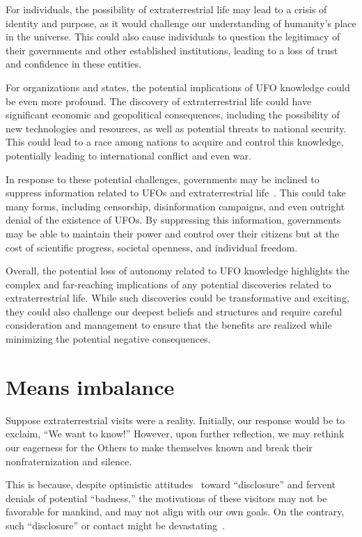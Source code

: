 For individuals, the possibility of extraterrestrial life may lead to a crisis of identity and purpose, as it would challenge our understanding of humanity's place in the universe. This could also cause individuals to question the legitimacy of their governments and other established institutions, leading to a loss of trust and confidence in these entities.

For organizations and states, the potential implications of UFO knowledge could be even more profound. The discovery of extraterrestrial life could have significant economic and geopolitical consequences, including the possibility of new technologies and resources, as well as potential threats to national security. This could lead to a race among nations to acquire and control this knowledge, potentially leading to international conflict and even war.

In response to these potential challenges, governments may be inclined to suppress information related to UFOs and extraterrestrial life~\cite{Wendt_2008}. This could take many forms, including censorship, disinformation campaigns, and even outright denial of the existence of UFOs. By suppressing this information, governments may be able to maintain their power and control over their citizens but at the cost of scientific progress, societal openness, and individual freedom.

Overall, the potential loss of autonomy related to UFO knowledge highlights the complex and far-reaching implications of any potential discoveries related to extraterrestrial life. While such discoveries could be transformative and exciting, they could also challenge our deepest beliefs and structures and require careful consideration and management to ensure that the benefits are realized while minimizing the potential negative consequences.

\section{Means imbalance}
\label{2023-UFO-part-Speculation-possible-consequences-pt} %

Suppose extraterrestrial visits were a reality.
Initially, our response would be to exclaim, ``We want to know!'' However, upon further reflection, we may rethink our eagerness for the Others to make themselves known
and break their nonfraternization and silence.

This is because, despite optimistic attitudes~\cite{Mazzola2020Apr} toward ``disclosure''
and fervent denials of potential ``badness,'' the motivations of these visitors may not be favorable for mankind,
and may not align with our own goals.
On the contrary, such ``disclosure'' or contact might be devastating~\cite{Schetsche_2019}.

